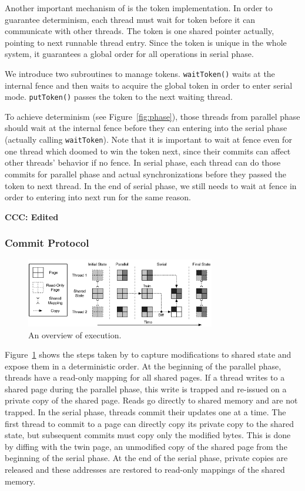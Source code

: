 Another important mechanism of \dthreads{} is the token implementation. 
In order to guarantee determinism, each thread must wait for token
before it can communicate with other threads. 
The token is one shared pointer actually, pointing to next runnable thread entry.
Since the token is unique in the whole system, it guarantees a global order for
all operations in serial phase. 

We introduce two subroutines to manage tokens. \texttt{waitToken()}
waits at the internal fence and then waits to acquire the global token
in order to enter serial mode. \texttt{putToken()} passes the token to
the next waiting thread.

To achieve determinism (see Figure~\ref{fig:phase}), those threads from parallel phase 
should wait at the internal fence before they can entering into the serial phase (actually calling
\texttt{waitToken}).
Note that it is important to wait at fence even for one thread which doomed to win the token next,
since their commits can affect other threads' behavior if no fence.
In serial phase, each thread can do those commits for parallel phase and actual synchronizations
before they passed the token to next thread. 
In the end of serial phase, we still needs to wait at fence in order to entering into next run for the same reason.


\textbf{CCC: Edited}

\subsubsection{Commit Protocol}
\begin{figure}
{\centering
\includegraphics[width=3.25in]{dthreads/figure/architecture-diagram}
\caption{An overview of \dthreads{} execution.\label{fig:architecture}}
}
\end{figure}

Figure~\ref{fig:architecture} shows the steps taken by \dthreads{} to capture modifications to shared state and expose them in a deterministic order.  At the beginning of the parallel phase, threads have a read-only mapping for all shared pages.  If a thread writes to a shared page during the parallel phase, this write is trapped and re-issued on a private copy of the shared page.  Reads go directly to shared memory and are not trapped.  In the serial phase, threads commit their updates one at a time.  The first thread to commit to a page can directly copy its private copy to the shared state, but subsequent commits must copy only the modified bytes.  This is done by diffing with the twin page, an unmodified copy of the shared page from the beginning of the serial phase.  At the end of the serial phase, private copies are released and these addresses are restored to read-only mappings of the shared memory.

